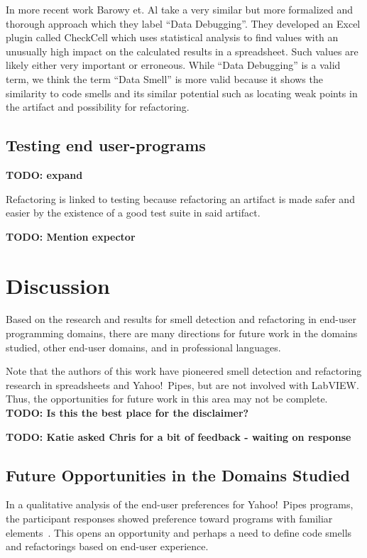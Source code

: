 \documentclass[10pt,conference,compsocconf]{IEEEtran}
\newcommand{\todo}[1]{\textbf{TODO: #1}}
\begin{document}
In more recent work Barowy et. Al \cite{barowy2014checkcell} take a very similar but more formalized and thorough approach which they label ``Data Debugging''.
They developed an Excel plugin called CheckCell which uses statistical analysis to find values with an unusually high impact on the calculated results in a spreadsheet.
Such values are likely either very important or erroneous.
While ``Data Debugging'' is a valid term, we think the term ``Data Smell'' is more valid because it shows the similarity to code smells and its similar potential such as locating weak points in the artifact and possibility for refactoring.

\subsection{Testing end user-programs}

\todo{expand}

Refactoring is linked to testing because refactoring an artifact is made safer and easier by the existence of a good test suite in said artifact.

\todo{Mention expector}

\section{Discussion}
\label{sec:discussion}

Based on the research and results for smell detection and refactoring in end-user programming domains, there are many directions for future work in the domains studied, other end-user domains, and in professional languages. 

Note that the authors of this work have pioneered smell detection and refactoring research in spreadsheets and Yahoo!\ Pipes, but are not involved with LabVIEW. Thus, the opportunities for future work in this area may not be complete.  \todo{Is this the best place for the disclaimer?}

\todo{Katie asked Chris for a bit of feedback - waiting on response}



\subsection{Future Opportunities in the Domains Studied}
In a qualitative analysis of the end-user preferences for Yahoo!\ Pipes programs, the participant responses showed preference toward programs with familiar elements~\cite{Stolee2015}. This opens an opportunity and perhaps a need to define code smells and refactorings based on end-user experience. 
\end{document}
